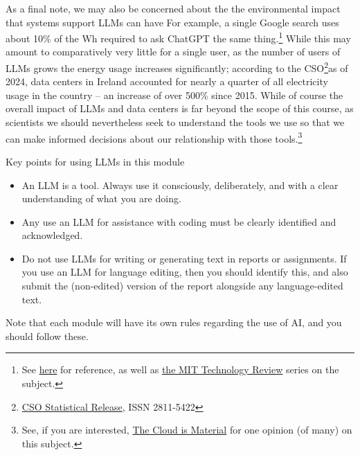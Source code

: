 \documentclass{tufte-book}
\begin{document}
As a final note, we may also be concerned about the the environmental impact that systems support LLMs can have For example, a single Google search uses about 10\% of the Wh required to ask ChatGPT the same thing.\footnote{See \href{https://www.rwdigital.ca/blog/how-much-energy-do-google-search-and-chatgpt-use/}{here} for reference, as well as \href{https://www.rwdigital.ca/blog/how-much-energy-do-google-search-and-chatgpt-use/}{the MIT Technology Review} series on the subject.} While this may amount to comparatively very little for a single user, as the number of users of LLMs grows the energy usage increases significantly; according to the CSO\footnote{\href{https://www.cso.ie/en/releasesandpublications/ep/p-dcmec/datacentresmeteredelectricityconsumption2024/}{CSO Statistical Release}, ISSN 2811-5422}as of 2024, data centers in Ireland accounted for nearly a quarter of all electricity usage in the country -- an increase of over 500\% since 2015. While of course the overall impact of LLMs and data centers is far beyond the scope of this course, as scientists we should nevertheless seek to understand the tools we use so that we can make informed decisions about our relationship with those tools.\footnote{See, if you are interested, \href{https://mit-serc.pubpub.org/pub/the-cloud-is-material/release/2}{The Cloud is Material} for one opinion (of many) on this subject.}

\begin{tcolorbox}[sharp corners=all, colback=white!75!red]
Key points for using LLMs in this module
\begin{itemize}   
\item An LLM is a tool. Always use it consciously, deliberately, and with a clear understanding of what you are doing.
\item Any use an LLM for assistance with coding must be clearly identified and acknowledged.
\item Do not use LLMs for writing or generating text in reports or assignments. If you use an LLM for language editing, then you should identify this, and also submit the (non-edited) version of the report alongside any language-edited text.
\end{itemize}
Note that each module will have its own rules regarding the use of AI, and you should follow these.
\end{tcolorbox} 



\end{document}
